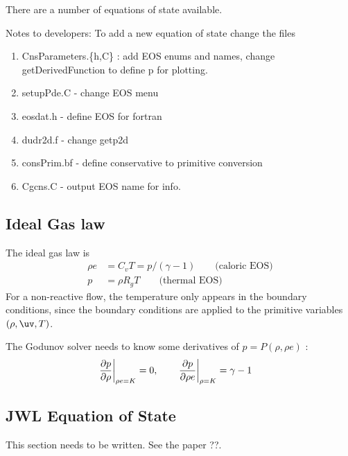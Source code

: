 \documentclass{article}
\begin{document}
There are a number of equations of state available. 

Notes to developers:
To add a new equation of state change the files
\begin{enumerate}
  \item CnsParameters.\{h,C\} : add EOS enums and names, change getDerivedFunction to define p for plotting.
  \item setupPde.C - change EOS menu 
  \item eosdat.h - define EOS for fortran
  \item dudr2d.f - change getp2d
  \item consPrim.bf - define conservative to primitive conversion
  \item Cgcns.C - output EOS name for info. 
\end{enumerate}


\subsection{Ideal Gas law}

The ideal gas law is
\begin{align}
 \rho e & =  C_v T = p/(\gamma-1) \qquad\mbox{(caloric EOS)}\label{eq:IdealEOS1} \\
 p & = \rho R_g T               \qquad\mbox{(thermal EOS)}\label{eq:IdealEOS2}
\end{align}
For a non-reactive flow, the temperature only appears in the boundary conditions, since the 
boundary conditions are applied to the primitive variables $(\rho,\uv,T)$.

The Godunov solver needs to know some derivatives of $p=P(\rho,\rho e)$ :
\begin{align}
 \left.{\partial p \over \partial \rho}\right\vert_{\rho e =K} &= 0, \qquad
 \left.{\partial p \over \partial \rho e}\right\vert_{\rho=K} = \gamma-1 
\end{align}

\subsection{JWL Equation of State}

This section needs to be written. See the paper ??.

\end{document}
